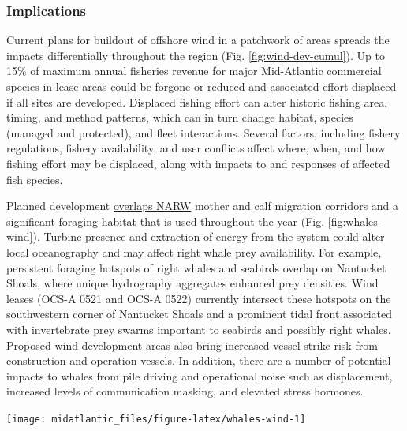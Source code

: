 \documentclass[
  10pt,
]{article}
\let\origfigure\figure
\let\endorigfigure\endfigure
\renewenvironment{figure}[1][2] {
    \expandafter\origfigure\expandafter[H]
} {
    \endorigfigure
}
\begin{document}
\subsubsection{Implications}\label{implications-6}

Current plans for buildout of offshore wind in a patchwork of areas spreads the impacts differentially throughout the region (Fig. \ref{fig:wind-dev-cumul}). Up to 15\% of maximum annual fisheries revenue for major Mid-Atlantic commercial species in lease areas could be forgone or reduced and associated effort displaced if all sites are developed. Displaced fishing effort can alter historic fishing area, timing, and method patterns, which can in turn change habitat, species (managed and protected), and fleet interactions. Several factors, including fishery regulations, fishery availability, and user conflicts affect where, when, and how fishing effort may be displaced, along with impacts to and responses of affected fish species.

Planned development \href{https://noaa-edab.github.io/catalog/persistent_hotspots.html}{overlaps NARW} mother and calf migration corridors and a significant foraging habitat that is used throughout the year (Fig. \ref{fig:whales-wind}). Turbine presence and extraction of energy from the system could alter local oceanography and may affect right whale prey availability. For example, persistent foraging hotspots of right whales and seabirds overlap on Nantucket Shoals, where unique hydrography aggregates enhanced prey densities. Wind leases (OCS-A 0521 and OCS-A 0522) currently intersect these hotspots on the southwestern corner of Nantucket Shoals and a prominent tidal front associated with invertebrate prey swarms important to seabirds and possibly right whales. Proposed wind development areas also bring increased vessel strike risk from construction and operation vessels. In addition, there are a number of potential impacts to whales from pile driving and operational noise such as displacement, increased levels of communication masking, and elevated stress hormones.

\begin{figure}

{\centering \texttt{[image: midatlantic\_files/figure-latex/whales-wind-1]} 

}

\caption{Northern Right Whale persistent hotspots (red shading) and Wind Energy Areas (black outlines).}\label{fig:whales-wind}
\end{figure}
\end{document}

